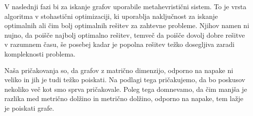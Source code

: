 \documentclass[a4paper,10pt, fleqn]{article}
\begin{document}
V naslednji fazi bi za iskanje grafov uporabile metahevristični sistem. To je vrsta algoritma v 
stohastični optimizaciji, ki uporablja naključnost za iskanje optimalnih ali čim bolj optimalnih 
rešitev za zahtevne probleme. Njihov namen ni nujno, da poišče najbolj optimalno rešitev, temveč 
da poišče dovolj dobre rešitve v razumnem času, še posebej kadar je popolna rešitev težko dosegljiva
zaradi kompleknosti problema.

Naša pričakovanja so, da grafov z matrično dimenzijo, odporno na napake ni veliko in jih je tudi 
težko poiskati. Na podlagi tega pričakujemo, da bo poskusov nekoliko več kot smo sprva pričakovale.
Poleg tega domnevamo, da čim manjša je razlika med metrično dolžino in metrično dolžino, odporno na 
napake, tem lažje je poiskati grafe. 
\end{document}
